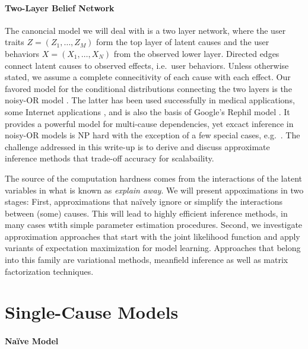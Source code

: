 \documentclass{article}
\begin{document}
\paragraph{Two-Layer Belief Network} The canoncial model we will deal with is a two layer network, where the user traits $Z=(Z_1,\dots,Z_M)$ form the top layer of latent causes and the user behaviors $X= (X_1,\dots,X_N)$ from the observed lower layer. Directed edges connect latent causes to observed effects, i.e.~user behaviors. Unless otherwise stated, we assume a complete connecitivity of each cause with each effect. Our favored model for the conditional distributions connecting the two layers is the noisy-OR model \cite{jaakkola1999variational, vsingliar2006noisy}. The latter has been used successfully in medical applications, some Internet applications \cite{platt2007fast}, and is also the basis of Google's Rephil model \cite{murphy2012machine}. It provides a powerful model for multi-cause dependencies, yet excact inference in noisy-OR models is NP hard \cite{cooper1990computational} with the exception of a few special cases, e.g.~\cite{halpern2013unsupervised}.   The challenge addressed in this write-up is to derive and discuss approximate inference methods that trade-off accuracy for scalabaility. 

The source of the computation hardness comes from the interactions of the latent variables in what is known as \textit{explain away}. We will present appoximations in two stages: First, approximations that na\"ively ignore or simplify the interactions between (some) causes. This will lead to highly efficient inference methods, in many cases wtith simple parameter estimation procedures.  Second, we investigate approximation approaches that start with the joint likelihood function and apply variants of expectation maximization for model learning. Approaches that belong into this family are variational methods, meanfield  inference as well as matrix factorization techniques. 


\section{Single-Cause Models} 

\paragraph{Na\"ive Model}
\end{document}
